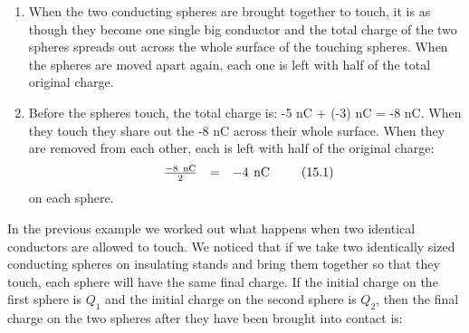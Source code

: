 {\begin{mdframed}[linewidth=4, leftmargin=40, rightmargin=40]
\begin{exercise}
\begin{enumerate}[noitemsep, label=\textbf{Step} \textbf{\arabic*}. ]
\begin{enumerate}[noitemsep, label=\textbf{\alph*}. ]
            \leftskip=20pt\rightskip=\leftskip\label{m38781*uid9}\item When the two conducting spheres are brought together to touch, it is as though they become one single big conductor and the total charge of the two spheres spreads out across the whole surface of the touching spheres. When the spheres are moved apart again, each one is left with half of the total original charge.
\label{m38781*uid10}\item Before the spheres touch, the total charge is: -5 nC + (-3) nC = -8 nC. When they touch they share out the -8 nC across their whole surface. When they are removed from each other, each is left with half of the original charge:
\label{m38781*id201455}\nopagebreak\noindent{}
    \begin{equation}
    \begin{array}{ccc}\hfill \frac{-8\phantom{\rule{4pt}{0ex}}\mathrm{nC}}{2}& =& -4\phantom{\rule{4pt}{0ex}}\mathrm{nC}\hfill \end{array}\tag{15.1}
      \end{equation}
on each sphere.
\end{enumerate}
      \end{enumerate}
    \end{exercise}
    \end{mdframed}
    }
    \noindent
      \label{m38781*eip-89}In the previous example we worked out what happens when two identical conductors are allowed to touch. We noticed that if we take two identically sized conducting spheres on insulating stands and bring them together so that they touch, each sphere will have the same final charge. If the initial charge on the first sphere is ${Q}_{1}$ and the initial charge on the second sphere is ${Q}_{2}$, then the final charge on the two spheres after they have been brought into contact is:
\label{m38781*id6214}\nopagebreak\noindent{}

